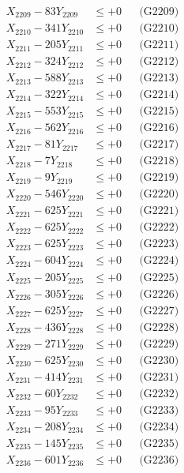 \documentclass[a4paper,10pt]{article}
\begin{document}
{\begin{align}
X_{2209} - 83Y_{2209} &\leq +0 && \text{(G2209)} \\
X_{2210} - 341Y_{2210} &\leq +0 && \text{(G2210)} \\
\allowbreak
X_{2211} - 205Y_{2211} &\leq +0 && \text{(G2211)} \\
X_{2212} - 324Y_{2212} &\leq +0 && \text{(G2212)} \\
X_{2213} - 588Y_{2213} &\leq +0 && \text{(G2213)} \\
X_{2214} - 322Y_{2214} &\leq +0 && \text{(G2214)} \\
X_{2215} - 553Y_{2215} &\leq +0 && \text{(G2215)} \\
X_{2216} - 562Y_{2216} &\leq +0 && \text{(G2216)} \\
X_{2217} - 81Y_{2217} &\leq +0 && \text{(G2217)} \\
X_{2218} - 7Y_{2218} &\leq +0 && \text{(G2218)} \\
X_{2219} - 9Y_{2219} &\leq +0 && \text{(G2219)} \\
X_{2220} - 546Y_{2220} &\leq +0 && \text{(G2220)} \\
\allowbreak
X_{2221} - 625Y_{2221} &\leq +0 && \text{(G2221)} \\
X_{2222} - 625Y_{2222} &\leq +0 && \text{(G2222)} \\
X_{2223} - 625Y_{2223} &\leq +0 && \text{(G2223)} \\
X_{2224} - 604Y_{2224} &\leq +0 && \text{(G2224)} \\
X_{2225} - 205Y_{2225} &\leq +0 && \text{(G2225)} \\
X_{2226} - 305Y_{2226} &\leq +0 && \text{(G2226)} \\
X_{2227} - 625Y_{2227} &\leq +0 && \text{(G2227)} \\
X_{2228} - 436Y_{2228} &\leq +0 && \text{(G2228)} \\
X_{2229} - 271Y_{2229} &\leq +0 && \text{(G2229)} \\
X_{2230} - 625Y_{2230} &\leq +0 && \text{(G2230)} \\
\allowbreak
X_{2231} - 414Y_{2231} &\leq +0 && \text{(G2231)} \\
X_{2232} - 60Y_{2232} &\leq +0 && \text{(G2232)} \\
X_{2233} - 95Y_{2233} &\leq +0 && \text{(G2233)} \\
X_{2234} - 208Y_{2234} &\leq +0 && \text{(G2234)} \\
X_{2235} - 145Y_{2235} &\leq +0 && \text{(G2235)} \\
X_{2236} - 601Y_{2236} &\leq +0 && \text{(G2236)} \\

\end{align}}
\end{document}
